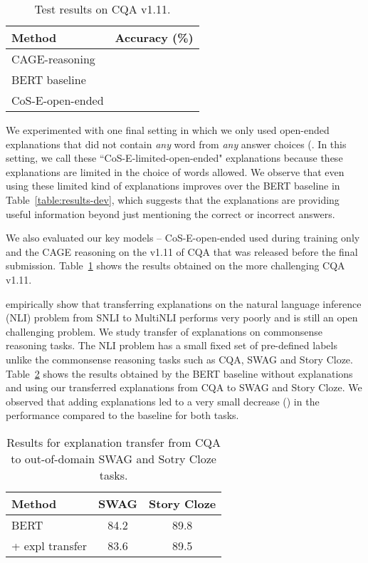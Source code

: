 \documentclass[11pt,a4paper]{article}
\begin{document}
\begin{table}[!ht]
\centering
\small
\begin{tabular}{lc}
\toprule
\textbf{Method}&\textbf{Accuracy (\%)}\\
\midrule
CAGE-reasoning &\\
BERT baseline & \\
CoS-E-open-ended &\\
\bottomrule
\end{tabular}
\caption{Test results on CQA v1.11.}
\vspace{-0.4cm}
\label{table:results-v1.11}
\end{table}

We experimented with one final setting in which we only used open-ended explanations that did not contain {\it any} word from {\it any} answer choices (. 
In this setting, we call these ``CoS-E-limited-open-ended" explanations because these explanations are limited in the choice of words allowed.
We observe that even using these limited kind of explanations improves over the BERT baseline in Table~\ref{table:results-dev},
which suggests that the explanations are providing useful information beyond just mentioning the correct or incorrect answers.

We also evaluated our key models -- CoS-E-open-ended used during training only and the CAGE reasoning on the v1.11 of CQA that was released before the final submission. Table~\ref{table:results-v1.11} shows the results obtained on the more challenging CQA v1.11. 

\citet{camburu2018snli} empirically show that transferring explanations on the natural language inference (NLI) problem from SNLI to MultiNLI performs very poorly and is still an open challenging problem. We study transfer of explanations on commonsense reasoning tasks. The NLI problem has a small fixed set of pre-defined labels unlike the commonsense reasoning tasks such as CQA, SWAG and Story Cloze. Table~\ref{table:results-transfer} shows the results obtained by the BERT baseline without explanations and using our transferred explanations from CQA to SWAG and Story Cloze. We observed that adding explanations led to a very small decrease () in the performance compared to the baseline for both tasks.

\begin{table}[!ht]
\centering
\small
\begin{tabular}{lcc}
\toprule
\textbf{Method}&\textbf{SWAG}&\textbf{Story Cloze}\\
\midrule
BERT&84.2&89.8\\
\qquad + expl transfer&83.6&89.5\\
\bottomrule
\end{tabular}
\caption{Results for explanation transfer from CQA to out-of-domain SWAG and Sotry Cloze tasks.}
\vspace{-0.5cm}
\label{table:results-transfer}
\end{table}
\end{document}
